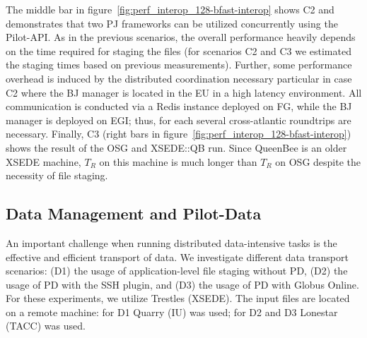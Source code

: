 \documentclass[conference]{IEEEtran}
\begin{document}


The middle bar in figure~\ref{fig:perf_interop_128-bfast-interop}
shows C2 and demonstrates that two PJ frameworks can be utilized
concurrently using the Pilot-API. As in the previous scenarios, the
overall performance heavily depends on the time required for staging
the files (for scenarios C2 and C3 we estimated the staging times
based on previous measurements). Further, some performance overhead is
induced by the distributed coordination necessary particular in case
C2 where the BJ manager is located in the EU in a high latency
environment.  All communication is conducted via a Redis instance
deployed on FG, while the BJ manager is deployed on EGI; thus, for
each \cu several cross-atlantic roundtrips are necessary.
Finally, C3 (right bars in
figure~\ref{fig:perf_interop_128-bfast-interop}) shows the result of
the OSG and XSEDE::QB run. Since QueenBee is an older XSEDE machine,
$T_R$ on this machine is much longer than $T_R$ on OSG despite the
necessity of file staging. 

\subsection{Data Management and Pilot-Data}
\label{sec:experiment-pilotdata}

  An important challenge when running distributed data-intensive
tasks is the effective and efficient transport of data. We investigate
different data transport scenarios: (D1) the usage of
application-level file staging without PD, (D2) the usage of PD with
the SSH plugin, and (D3)
the usage of PD with Globus Online. For these experiments, we utilize
Trestles (XSEDE). The input files are located on a remote machine: for
D1 Quarry (IU) was used; for D2 and D3 Lonestar (TACC) was used.
\end{document}
